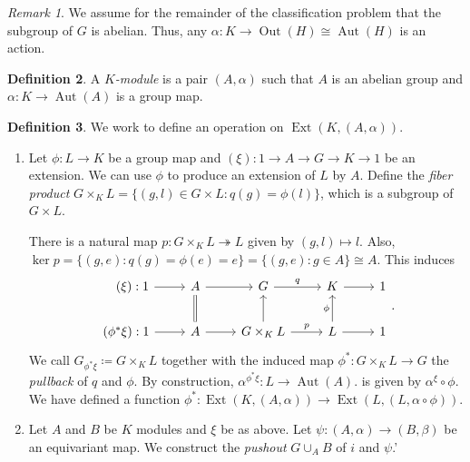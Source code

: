 \documentclass[10pt,letterpaper,cm]{nupset}
\theoremstyle{definition}
\newtheorem{definition}{Definition}[subsection]
\theoremstyle{theorem}
\theoremstyle{remark}
\newtheorem{remark}[definition]{Remark}
\newcommand{\1}{\mathbf{1}}
\newcommand{\0}{\vec 0}
\DeclareMathOperator{\aut}{Aut}
\DeclareMathOperator{\ext}{Ext}
\DeclareMathOperator{\out}{Out}
\begin{document}
\begin{remark}
We assume for the remainder of the classification problem that the subgroup of $G$ is abelian. Thus, any $\alpha : K \to \out(H)\cong \aut(H)$ is an action.
\end{remark}

\begin{definition}
A \textit{$K$-module} is a pair $(A, \alpha)$ such that $A$ is an abelian group and $\alpha : K \to \aut(A)$ is a group map.
\end{definition}

\begin{definition} We work to define an operation on $\ext(K, (A, \alpha))$.
\begin{enumerate}
\item Let $\phi  : L \to K$ be a group map and $(\xi) : 1 \to A \to G \to K \to 1$ be an extension. We can use $\phi$ to produce an extension of $L$ by $A$. Define the \textit{fiber product} $G \times_K L = \{(g, l) \in G \times L : q(g) = \phi(l)\}$, which is a subgroup of $G \times L$.

There is a natural map $p: G\times_K L \twoheadrightarrow L$ given by $(g, l) \mapsto l$. Also, $\ker p = \{(g, e) : q(g) = \phi(e) =e \} = \{(g, e) : g \in A\} \cong A$. This induces
\[
\begin{tikzcd}
\quad (\xi): 1 \arrow[r] & A \arrow[r] & G \arrow[r, "q"] & K \arrow[r] & 1 \\
(\phi^{\ast}\xi): 1 \arrow[r] & A \arrow[r] \arrow[u, equal] & G\times_K L \arrow[r, "p"] \arrow[u] & L \arrow[u, "\phi"] \arrow[r] & 1
\end{tikzcd}.
\]
We call $G_{\phi^{\ast}\xi}\coloneqq  G\times_{K}L$ together with the induced map $\phi^{\ast} : G\times_{K}L\to G$ the \textit{pullback} of $q$ and $\phi$.  By construction, $\alpha^{\phi^{\ast}\xi} : L \to \aut(A)$. is given by $\alpha^{\xi} \circ \phi$. We have defined a function $\phi^{\ast} : \ext(K, (A, \alpha)) \to \ext(L, (L, \alpha \circ \phi))$. 

\item Let $A$ and $B$ be $K$ modules and $\xi$ be as above. Let $\psi: (A, \alpha) \to (B, \beta)$ be an equivariant map. We construct the \textit{pushout} $G \cup_A B$ of $i$ and $\psi$.'


\end{enumerate}
\end{definition}
\end{document}

